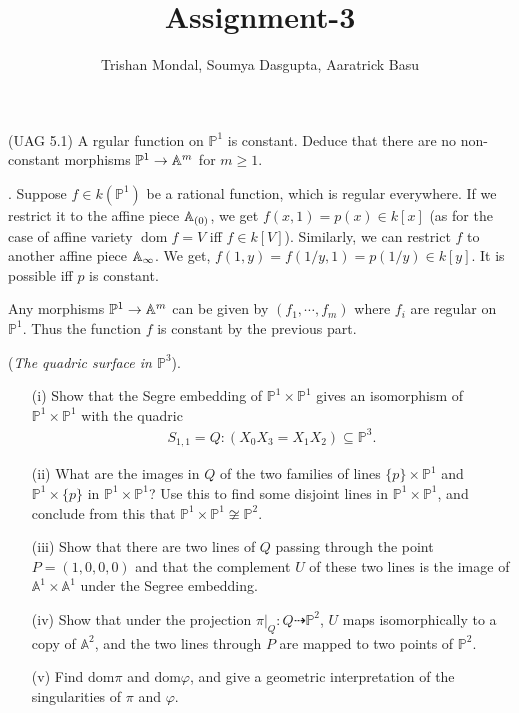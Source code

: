 \documentclass[12pt]{article}
\title{Assignment-3}
\author{Trishan Mondal, Soumya Dasgupta, Aaratrick Basu}
\date{}
\begin{document}
\maketitle
\setcounter{section}{3}

\begin{prob} %
    (UAG 5.1) A rgular function on $\mathbb{P}^1$ is constant. Deduce that there are no non-constant morphisms $\mathbb{P}^1 \to \mathbb{A}^m$ for $m \geq 1$.
\end{prob}

\sol. Suppose  $f \in k(\mathbb{P}^1)$ be a rational function, which is regular everywhere. If we restrict it to the affine piece $\mathbb{A}_{(0)}$, we get $f(x,1) = p(x) \in k[x]$ (as for the case of affine variety $\operatorname{dom} f = V$ iff $f \in k[V]$). Similarly, we can restrict $f$ to another affine piece $\mathbb{A}_{\infty}$. We get, $f(1,y) = f(1/y,1) = p(1/y) \in k[y]$. It is possible iff $p$ is constant.

\vspace*{0.2cm}

\noindent Any morphisms  $\mathbb{P}^1 \to \mathbb{A}^m$ can be given by $(f_1,\cdots,f_m)$ where $f_i$ are regular on $\mathbb{P}^1$. Thus the function $f$ is constant by the previous part. \Qed

\begin{prob}
    (\textit{The quadric surface in $\mathbb{P}^3$}). 
    \begin{enumerate}
        \item[(i)] Show that the Segre embedding of $\mathbb{P}^1 \times \mathbb{P}^1$ gives an isomorphism of $\mathbb{P}^1 \times \mathbb{P}^1$ with the quadric 
        \begin{align*}
            S_{1,1} = Q : (X_0X_3 = X_1X_2) \subseteq \mathbb{P}^3.
        \end{align*}
        \item[(ii)] What are the images in $Q$ of the two families of lines $\{p\} \times \mathbb{P}^1$ and $\mathbb{P}^1 \times \{p\}$ in $\mathbb{P}^1 \times \mathbb{P}^1$? Use this to find some disjoint lines in $\mathbb{P}^1 \times \mathbb{P}^1$, and conclude from this that $\mathbb{P}^1 \times \mathbb{P}^1 \not\cong \mathbb{P}^2$.
        \item[(iii)] Show that there are two lines of $Q$ passing through the point $P = (1,0,0,0)$ and that the complement $U$ of these two lines is the image of $\mathbb{A}^1 \times \mathbb{A}^1$ under the Segree embedding. 
        \item[(iv)] Show that under the projection $\pi\vert_{Q} : Q \dashrightarrow \mathbb{P}^2$, $U$ maps isomorphically to a copy of $\mathbb{A}^2$, and the two lines through $P$ are mapped to two points of $\mathbb{P}^2$. 
        \item[(v)] Find $\mathrm{dom} \pi$ and $\mathrm{dom} \varphi$, and give a geometric interpretation of the singularities of $\pi$ and $\varphi$.
    \end{enumerate}
    \end{prob}
    
\end{document}
